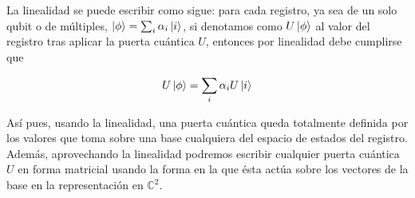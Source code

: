 \documentclass[11pt, spanish]{report}
\numberwithin{equation}{section}
\numberwithin{defin}{section}
\begin{document}

La linealidad se puede escribir como sigue: para cada registro, ya sea de un solo qubit o de múltiples, $\ket{\phi}=\sum_i\alpha_i\ket{i}$, si denotamos como $U\ket{\phi}$ al valor del registro tras aplicar la puerta cuántica $U$, entonces por linealidad debe cumplirse que

\begin{equation}
U\ket{\phi}=\sum_i\alpha_iU\ket{i}
\end{equation}

Así pues, usando la linealidad, una puerta cuántica queda totalmente definida por los valores que toma sobre una base cualquiera del espacio de estados del registro. Además, aprovechando la linealidad podremos escribir cualquier puerta cuántica $U$ en forma matricial usando la forma en la que ésta actúa sobre los vectores de la base en la representación en $\mathbb{C}^2$.\\
\end{document}
